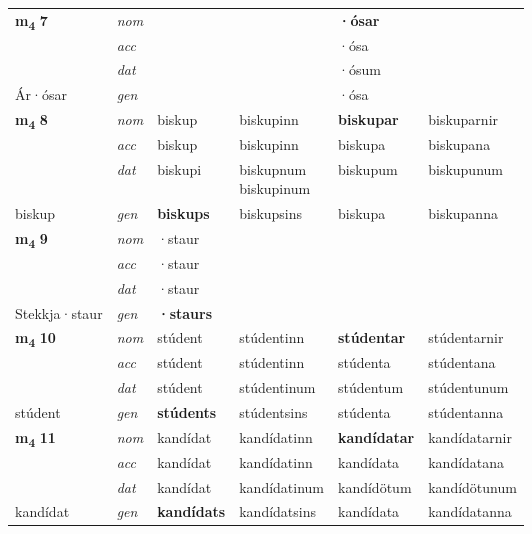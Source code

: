 \begin{longtable}[l]{X>{\footnotesize\itshape}XXXXX}
\multirow{3}{*}{{{\textbf{m{\textsubscript{4}}} \Large{\textbf{7}}}}} & nom &  &  & \textbf{·ósar} &  \\*
 & acc &  &  & ·ósa &  \\*
 & dat &  &  & ·ósum &  \\*
 {\footnotesize{Ár\allowbreak ·ósar}} & gen & \textbf{} &  & ·ósa &  \\
\cmidrule{1-6}

\multirow{3}{*}{{{\textbf{m{\textsubscript{4}}} \Large{\textbf{8}}}}} & nom & biskup & biskupinn & \textbf{biskupar} & biskuparnir \\*
 & acc & biskup & biskupinn & biskupa & biskupana \\*
 & dat & biskupi & \specialcell{biskupnum\\ biskupinum} & biskupum & biskupunum \\*
 {\footnotesize{biskup}} & gen & \textbf{biskups} & biskupsins & biskupa & biskupanna \\
\cmidrule{1-6}

\multirow{3}{*}{{{\textbf{m{\textsubscript{4}}} \Large{\textbf{9}}}}} & nom & ·staur &  & \textbf{} &  \\*
 & acc & ·staur &  &  &  \\*
 & dat & ·staur &  &  &  \\*
 {\footnotesize{Stekkja\allowbreak ·staur}} & gen & \textbf{·staurs} &  &  &  \\
\cmidrule{1-6}

\multirow{3}{*}{{{\textbf{m{\textsubscript{4}}} \Large{\textbf{10}}}}} & nom & stúdent & stúdentinn & \textbf{stúdentar} & stúdentarnir \\*
 & acc & stúdent & stúdentinn & stúdenta & stúdentana \\*
 & dat & stúdent & stúdentinum & stúdentum & stúdentunum \\*
 {\footnotesize{stúdent}} & gen & \textbf{stúdents} & stúdentsins & stúdenta & stúdentanna \\
\cmidrule{1-6}

\multirow{3}{*}{{{\textbf{m{\textsubscript{4}}} \Large{\textbf{11}}}}} & nom & kandídat & kandídatinn & \textbf{kandídatar} & kandídatarnir \\*
 & acc & kandídat & kandídatinn & kandídata & kandídatana \\*
 & dat & kandídat & kandídatinum & kandídötum & kandídötunum \\*
 {\footnotesize{kandídat}} & gen & \textbf{kandídats} & kandídatsins & kandídata & kandídatanna \\
\cmidrule{1-6}


\end{longtable}

